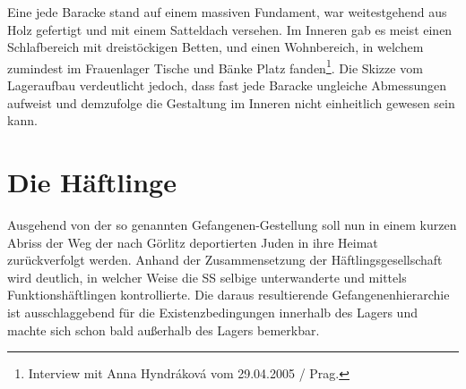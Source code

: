 \documentclass[a4paper,12pt,ngerman,
]{nisebook}
\begin{document}

Eine jede Baracke stand auf einem massiven Fundament, war weitestgehend aus Holz gefertigt und mit einem Satteldach versehen. Im Inneren gab es meist einen Schlafbereich mit dreistöckigen Betten, und einen Wohnbereich, in welchem zumindest im Frauenlager Tische und Bänke Platz fanden\footnote{Interview mit Anna Hyndr\'akov\'a vom 29.04.2005 / Prag.}. Die Skizze vom Lageraufbau verdeutlicht jedoch, dass fast jede Baracke ungleiche Abmessungen aufweist und demzufolge die Gestaltung im Inneren nicht einheitlich gewesen sein kann.


\section{Die Häftlinge}
Ausgehend von der so genannten Gefangenen-Gestellung soll nun in einem kurzen Abriss der Weg der nach Görlitz deportierten Juden in ihre Heimat zurückverfolgt werden. Anhand der Zusammensetzung der Häftlingsgesellschaft wird deutlich, in welcher Weise die SS selbige unterwanderte und mittels Funktionshäftlingen kontrollierte. Die daraus resultierende Gefangenenhierarchie ist ausschlaggebend für die Existenzbedingungen innerhalb des Lagers und machte sich schon bald außerhalb des Lagers bemerkbar.
\end{document}
